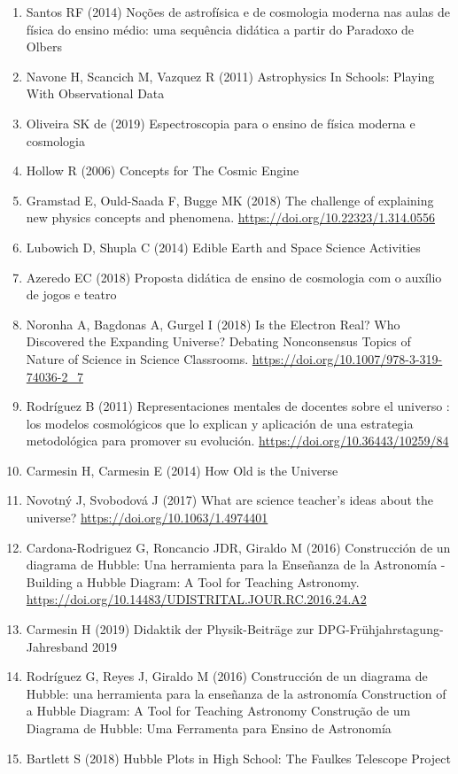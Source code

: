 {\begin{enumerate}
\item Santos RF (2014) Noções de astrofísica e de cosmologia moderna nas aulas de física do ensino médio: uma sequência didática a partir do Paradoxo de Olbers
\item Navone H, Scancich M, Vazquez R (2011) Astrophysics In Schools: Playing With Observational Data
\item Oliveira SK de (2019) Espectroscopia para o ensino de física moderna e cosmologia
\item Hollow R (2006) Concepts for The Cosmic Engine
\item Gramstad E, Ould-Saada F, Bugge MK (2018) The challenge of explaining new physics concepts and phenomena. \url{https://doi.org/10.22323/1.314.0556}
\item Lubowich D, Shupla C (2014) Edible Earth and Space Science Activities
\item Azeredo EC (2018) Proposta didática de ensino de cosmologia com o auxílio de jogos e teatro
\item Noronha A, Bagdonas A, Gurgel I (2018) Is the Electron Real? Who Discovered the Expanding Universe? Debating Nonconsensus Topics of Nature of Science in Science Classrooms. \url{https://doi.org/10.1007/978-3-319-74036-2_7}
\item Rodríguez B (2011) Representaciones mentales de docentes sobre el universo : los modelos cosmológicos que lo explican y aplicación de una estrategia metodológica para promover su evolución. \url{https://doi.org/10.36443/10259/84}
\item Carmesin H, Carmesin E (2014) How Old is the Universe
\item Novotný J, Svobodová J (2017) What are science teacher’s ideas about the universe? \url{https://doi.org/10.1063/1.4974401}
\item Cardona-Rodriguez G, Roncancio JDR, Giraldo M (2016) Construcción de un diagrama de Hubble: Una herramienta para la Enseñanza de la Astronomía - Building a Hubble Diagram: A Tool for Teaching Astronomy. \url{https://doi.org/10.14483/UDISTRITAL.JOUR.RC.2016.24.A2}
\item Carmesin H (2019) Didaktik der Physik-Beiträge zur DPG-Frühjahrstagung-Jahresband 2019
\item Rodríguez G, Reyes J, Giraldo M (2016) Construcción de un diagrama de Hubble: una herramienta para la enseñanza de la astronomía Construction of a Hubble Diagram: A Tool for Teaching Astronomy Construção de um Diagrama de Hubble: Uma Ferramenta para Ensino de Astronomía
\item Bartlett S (2018) Hubble Plots in High School: The Faulkes Telescope Project

\end{enumerate}}
